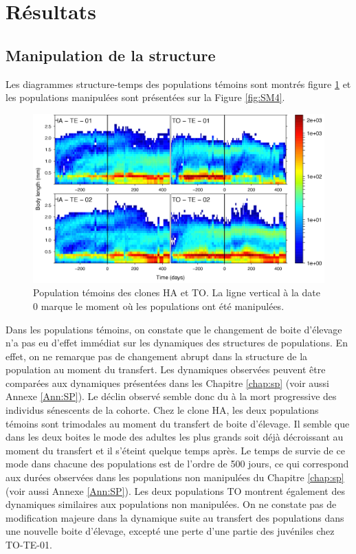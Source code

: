 \section{Résultats}

\subsection{Manipulation de la structure}

Les diagrammes structure-temps des populations témoins sont montrés figure
\ref{fig:SM3} et les populations manipulées sont présentées sur la Figure
\ref{fig:SM4}.

\begin{figure}[!ht]
\begin{center}
\includegraphics[width=1\textwidth]{1_CorpsDeThese/Resumes/Fig/SM04}
\caption[Population
témoins des clones HA et TO]{Population
témoins des clones HA et TO. La ligne vertical à la date 0 marque le moment où
les populations ont été manipulées.}
\label{fig:SM3}
\end{center}
\end{figure}

Dans les populations témoins, on constate que le changement de boite d'élevage
n'a pas eu d'effet immédiat sur les dynamiques des structures de populations. En
effet, on ne remarque pas de changement abrupt dans la structure de la
population au moment du transfert. Les dynamiques observées
peuvent être comparées aux dynamiques présentées dans les Chapitre \ref{chap:sp}
(voir aussi Annexe \ref{Ann:SP}). Le déclin observé semble donc du à la mort
progressive des individus sénescents de la cohorte.
Chez le clone HA, les deux populations témoins sont trimodales au moment du transfert de boite d'élevage. Il semble que dans
les deux boites le mode des adultes les plus grands soit déjà décroissant au
moment du transfert et il s'éteint quelque temps après. Le temps de survie de ce
mode dans chacune des populations est de l'ordre de 500 jours, ce qui correspond
aux durées observées dans les populations non manipulées du Chapitre
\ref{chap:sp} (voir aussi Annexe \ref{Ann:SP}). Les deux populations TO montrent
également des dynamiques similaires aux populations non manipulées. On ne
constate pas de modification majeure dans la dynamique suite au transfert des
populations dans une nouvelle boite d'élevage, excepté une perte d'une partie
des juvéniles chez TO-TE-01.

